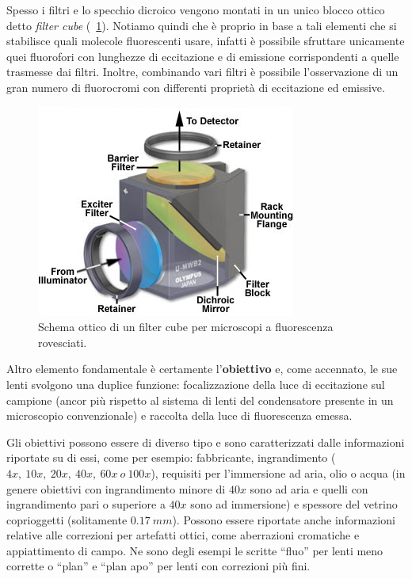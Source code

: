 Spesso i filtri e lo specchio dicroico vengono montati in un unico blocco ottico detto \textit{filter cube} (\figurename~\ref{fig:cube}). 
Notiamo quindi che è proprio in base a tali elementi che si stabilisce quali molecole fluorescenti usare, infatti è possibile sfruttare unicamente quei fluorofori con lunghezze di eccitazione e di emissione corrispondenti a quelle trasmesse dai filtri. 
Inoltre, combinando vari filtri è possibile l'osservazione di un gran numero di fluorocromi con differenti proprietà di eccitazione ed emissive.

\begin{figure}
 \centering
 \includegraphics[scale=.65]{img/CAP2cube.jpg}
 \caption{\small{Schema ottico di un filter cube per microscopi a fluorescenza rovesciati.}}
 \label{fig:cube}
\end{figure}

Altro elemento fondamentale è certamente l'\textbf{obiettivo} e, come accennato, le sue lenti svolgono una duplice funzione: focalizzazione della luce di eccitazione sul campione (ancor più rispetto al sistema di lenti del condensatore presente in un microscopio convenzionale) e raccolta della luce di fluorescenza emessa. 

Gli obiettivi possono essere di diverso tipo e sono caratterizzati dalle informazioni riportate su di essi, come per esempio: fabbricante, ingrandimento ($4x,\ 10x,\ 20x,\ 40x,\ 60x\ o\ 100x$), requisiti per l'immersione ad aria, olio o acqua (in genere obiettivi con ingrandimento minore di $40x$ sono ad aria e quelli con ingrandimento pari o superiore a $40x$ sono ad immersione) e spessore del vetrino coprioggetti (solitamente $0.17\ mm$).  
Possono essere riportate anche informazioni relative alle correzioni per artefatti ottici, come aberrazioni cromatiche e appiattimento di campo.
Ne sono degli esempi le scritte ``fluo'' per lenti meno corrette o ``plan'' e ``plan apo'' per lenti con correzioni più fini. 

